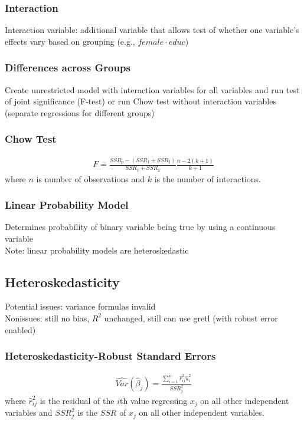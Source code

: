 \documentclass[12pt]{article}
\numberwithin{equation}{section}
\begin{document}
\subsubsection{Interaction}
Interaction variable: additional variable that allows test of whether one variable's effects vary based on grouping (e.g., $female \cdot educ$)

\subsubsection{Differences across Groups}
Create unrestricted model with interaction variables for all variables and run test of joint significance (F-test) or run Chow test without interaction variables (separate regressions for different groups)

\subsubsection{Chow Test}
\begin{gather}
    F = \frac{SSR_p - (SSR_1 + SSR_2)}{SSR_1 + SSR_2} \frac{n - 2(k+1)}{k+1}
\end{gather}
where $n$ is number of observations and $k$ is the number of interactions.

\subsubsection{Linear Probability Model}
Determines probability of binary variable being true by using a continuous variable \\[0.5cm]
Note: linear probability models are heteroskedastic

\subsection{Heteroskedasticity}

Potential issues: variance formulas invalid \\
Nonissues: still no bias, $R^2$ unchanged, still can use gretl (with robust error enabled)

\subsubsection{Heteroskedasticity-Robust Standard Errors}
\begin{gather}
    \widehat{Var}(\hat{\beta}_j) = \frac{\sum_{i=1}^{n} \hat{r}_{ij}^{2} \hat{u}_i^2}{SSR_j^2}
\end{gather}
where $\hat{r}_{ij}^{2}$ is the residual of the $i$th value regressing $x_j$ on all other independent variables and $SSR_j^2$ is the $SSR$ of $x_j$ on all other independent variables.
\end{document}
